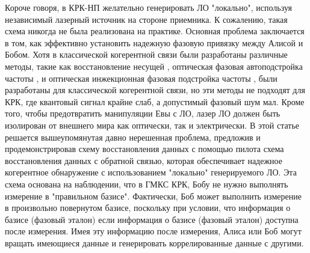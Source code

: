 Короче говоря, в КРК-НП желательно генерировать ЛО "локально", используя независимый лазерный источник на стороне приемника. К сожалению, такая схема никогда не была реализована на практике. Основная проблема заключается в том, как эффективно установить надежную фазовую привязку между Алисой и Бобом. Хотя в классической когерентной связи были разработаны различные методы, такие как восстановление несущей \cite{ip2007}, оптическая фазовая автоподстройка частоты \cite{ma2013}, и оптическая инжекционная фазовая подстройка частоты \cite{fice2011}, были разработаны для классической когерентной связи, но эти методы не подходят для КРК, где квантовый сигнал крайне слаб, а допустимый фазовый шум мал.
Кроме того, чтобы предотвратить манипуляции Евы с ЛО, лазер ЛО должен быть изолирован от внешнего мира как оптически, так и электрически.
В этой статье решается вышеупомянутая давно нерешенная проблема, предложив и продемонстрировав схему восстановления данных с помощью пилота схема восстановления данных с обратной связью, которая обеспечивает надежное когерентное обнаружение с использованием "локально" генерируемого ЛО.
Эта схема основана на наблюдении, что в ГМКС КРК, Бобу не нужно выполнять измерение в "правильном базисе". Фактически, Боб может выполнить измерение в произвольно повернутом базисе, поскольку при условии, что информация о базисе (фазовый эталон) если информация о базисе (фазовый эталон) доступна после измерения. Имея эту информацию  после измерения, Алиса или Боб могут вращать имеющиеся данные и генерировать коррелированные данные с другими. 
